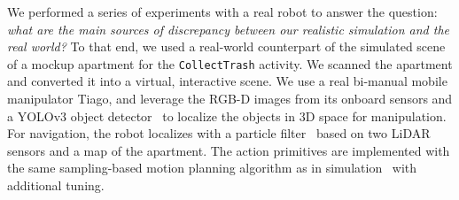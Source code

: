 We performed a series of experiments with a real robot to answer the question: \textit{what are the main sources of discrepancy between our realistic simulation and the real world?}
To that end, we used a real-world counterpart of the simulated scene of a mockup apartment for the \texttt{CollectTrash} activity. We scanned the apartment and converted it into a virtual, interactive scene. %
We use a real bi-manual mobile manipulator Tiago, and leverage the RGB-D images from its onboard sensors and a YOLOv3 object detector~\cite{redmon2018yolov3,bjelonicYolo2018} to localize the objects in 3D space for manipulation. 
For navigation, the robot localizes with a particle filter~\cite{thrun2005probabilistic} based on two LiDAR sensors and a map of the apartment.
The action primitives are implemented with the same sampling-based motion planning algorithm as in simulation~\cite{kuffner2000rrt,Jordan.Perez.ea:CSAIL13} with additional tuning. 
